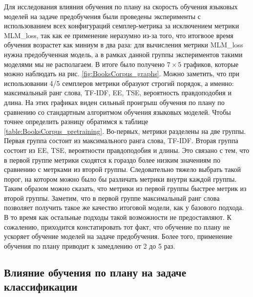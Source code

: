 \documentclass{spbau-diploma}
\begin{document}
Для исследования влияния обучения по плану на скорость обучения языковых моделей на задаче предобучения были проведены эксперименты с использованием всех конфигураций семплер-метрика за исключением метрики MLM\_loss, так как ее применение неразумно из-за того, что итогвоое время обучения возрастет как миниум в два раза: для вычисления метрики MLM\_loss нужна предобученная модель, а в рамках данной группы экспериментов такими моделями мы не располагаем. В итоге было получено $7\times 5$ графиков, которые можно наблюдать на рис. \ref{fig:BooksCorpus_graphs}. Можно заметить, что при использовании 4/5 семплеров метрики  образуют строгий порядок, а именно: максимальный ранг слова, TF-IDF, EE, TSE, вероятность правдоподобия и длина. На этих графиках виден сильный проигрыш обучения по плану по сравнению со стандартным алгоритмом обучения языковых моделей. Чтобы точнее определить разницу обратимся к таблице \ref{table:BooksCorpus_pretraining}. Во-первых, метрики разделены на две группы. Первая группа состоит из максимального ранга слова, TF-IDF. Вторая группа состоит из EE, TSE, вероятности правдоподобия и длины. Это связано с тем, что в первой группе метрики сходятся к гораздо более низким значениям по сравнению с метрками из второй группы. Следовательно тяжело выбрать такой порог, на котором можно было бы различать метрики внутри каждой группы. Таким образом можно сказать, что метрики из первой группы быстрее метрик из второй группы. Заметим, что в первой группе максимальный ранг слова позволяет получить такое же качество итоговой модели, как у базового подхода. В то время как остальные подходы такой возможности не предоставляют. К сожалению, приходится констатировать тот факт, что обучение по плану не ускоряет обучение моделей на задаче предобучения. Более того, применение обучения по плану приводит к замедлению от 2 до 5 раз.

\pagebreak
\subsection{Влияние обучения по плану на задаче классификации}
\end{document}
